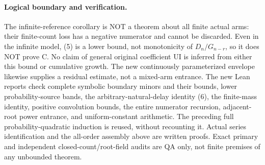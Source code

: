 \paragraph{Logical boundary and verification.}
The infinite-reference corollary is NOT a theorem about all finite
actual arms: their finite-count loss has a negative numerator and
cannot be discarded. Even in the infinite model, (5) is a lower bound,
not monotonicity of $D_n/G_{n-r}$, so it does NOT prove C. No claim of
general original coefficient UI is inferred from either this bound
or cumulative growth. The new continuously parameterized envelope
likewise supplies a residual estimate, not a mixed-arm entrance.
The new Lean reports check complete symbolic boundary minors and their
bounds, lower probability-source bands, the arbitrary-natural-delay
identity (6), the finite-mass identity, positive convolution bounds,
the entire numerator recursion, adjacent-root power entrance, and
uniform-constant arithmetic. The preceding full probability-quadratic
induction is reused, without recounting it. Actual series identification
and the all-order assembly above are written proofs. Exact primary and
independent closed-count/root-field audits are QA only, not finite
premises of any unbounded theorem.
